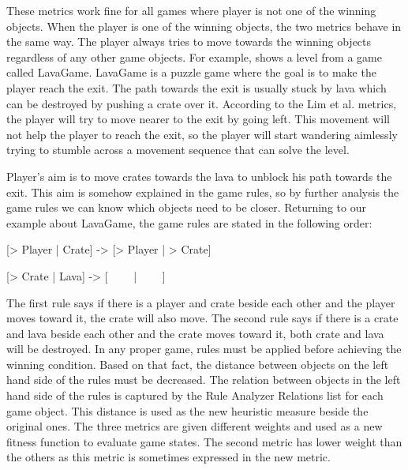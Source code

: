 \begin{hcfigure}
\begin{minipage}{0.45\textwidth}
  		\caption{Example of distance between player and winning objects metric}
  		\label{Figure:bestFS2}
	\end{minipage}
\end{hcfigure}

These metrics work fine for all games where player is not one of the winning objects. When the player is one of the winning objects, the two metrics behave in the same way. The player always tries to move towards the winning objects regardless of any other game objects. For example,  shows a level from a game called LavaGame. LavaGame is a puzzle game where the goal is to make the player reach the exit. The path towards the exit is usually stuck by lava which can be destroyed by pushing a crate over it. According to the Lim et al. metrics, the player will try to move nearer to the exit by going left. This movement will not help the player to reach the exit, so the player will start wandering aimlessly trying to stumble across a movement sequence that can solve the level.


Player's aim is to move crates towards the lava to unblock his path towards the exit. This aim is somehow explained in the game rules, so by further analysis the game rules we can know which objects need to be closer. Returning to our example about LavaGame, the game rules are stated in the following order:
\begin{center}{[> Player | Crate] -> [> Player | > Crate]}\end{center}
\begin{center}{[> Crate | Lava] -> [ \ \ \ \ | \ \ \ \ ]}\end{center}
The first rule says if there is a player and crate beside each other and the player moves toward it, the crate will also move. The second rule says if there is a crate and lava beside each other and the crate moves toward it, both crate and lava will be destroyed. In any proper game, rules must be applied before achieving the winning condition. Based on that fact, the distance between objects on the left hand side of the rules must be decreased. The relation between objects in the left hand side of the rules is captured by the Rule Analyzer Relations list for each game object. This distance is used as the new heuristic measure beside the original ones. The three metrics are given different weights and used as a new fitness function to evaluate game states. The second metric has lower weight than the others as this metric is sometimes expressed in the new metric.\\\par

